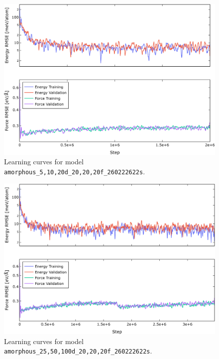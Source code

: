 
\begin{figure}
  \begin{center}
    \includegraphics[width=.8\textwidth]{
      asset/amorphous_5,10,20d_20,20,20f_260222622s_energy_force_l_curve.jpg
    }
  \end{center}
  \caption{Learning curves for model \texttt{amorphous\_5,10,20d\_20,20,20f\_260222622s}.}
  \label{fig:amorphous_5,10,20d_20,20,20f_260222622s-learning-curves}
\end{figure}

\begin{figure}
  \begin{center}
    \includegraphics[width=.8\textwidth]{
      asset/amorphous_25,50,100d_20,20,20f_260222622s_energy_force_l_curve.jpg
    }
  \end{center}
  \caption{Learning curves for model \texttt{amorphous\_25,50,100d\_20,20,20f\_260222622s}.}
  \label{fig:amorphous_25,50,100d_20,20,20f_260222622s-learning-curves}
\end{figure}


